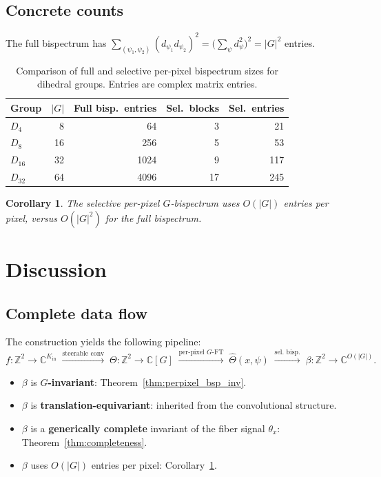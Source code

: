 \documentclass{article}
\newtheorem{corollary}[theorem]{Corollary}
\theoremstyle{definition}
\theoremstyle{remark}
\newcommand{\C}{\mathbb{C}}
\newcommand{\Z}{\mathbb{Z}}
\begin{document}
\subsection{Concrete counts}

The full bispectrum has $\sum_{(\psi_1,\psi_2)} (d_{\psi_1} d_{\psi_2})^2 = \bigl(\sum_\psi d_\psi^2\bigr)^2 = |G|^2$ entries.

\begin{table}[h]
\centering
\begin{tabular}{lrrrr}
\toprule
\textbf{Group} & $|G|$ & \textbf{Full bisp.\ entries} & \textbf{Sel.\ blocks} & \textbf{Sel.\ entries} \\
\midrule
$D_4$ & 8 & 64 & 3 & 21 \\
$D_8$ & 16 & 256 & 5 & 53 \\
$D_{16}$ & 32 & 1024 & 9 & 117 \\
$D_{32}$ & 64 & 4096 & 17 & 245 \\
\bottomrule
\end{tabular}
\caption{Comparison of full and selective per-pixel bispectrum sizes for dihedral groups. Entries are complex matrix entries.}
\label{tab:counts}
\end{table}

\begin{corollary}\label{cor:scaling}
The selective per-pixel $G$-bispectrum uses $O(|G|)$ entries per pixel, versus $O(|G|^2)$ for the full bispectrum.
\end{corollary}

\section{Discussion}

\subsection{Complete data flow}

The construction yields the following pipeline:
\[
f : \Z^2 \to \C^{K_{\mathrm{in}}}
\;\xrightarrow{\text{steerable conv}}\;
\Theta : \Z^2 \to \C[G]
\;\xrightarrow{\text{per-pixel } G\text{-FT}}\;
\widehat{\Theta}(x, \psi)
\;\xrightarrow{\text{sel.\ bisp.}}\;
\beta : \Z^2 \to \C^{O(|G|)}.
\]

\begin{itemize}
    \item $\beta$ is \textbf{$G$-invariant}: Theorem~\ref{thm:perpixel_bsp_inv}.
    \item $\beta$ is \textbf{translation-equivariant}: inherited from the convolutional structure.
    \item $\beta$ is a \textbf{generically complete} invariant of the fiber signal $\theta_x$: Theorem~\ref{thm:completeness}.
    \item $\beta$ uses $O(|G|)$ entries per pixel: Corollary~\ref{cor:scaling}.
\end{itemize}
\end{document}
